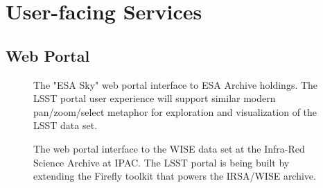 \documentclass[DM,lsstdraft,toc]{lsstdoc}
\begin{document}
\section{User-facing Services}

\subsection{Web Portal\label{sec:portal}}

\begin{figure}
	\centering
	\caption{The "ESA Sky" web portal interface to ESA Archive holdings. The LSST portal user
		experience will support similar modern pan/zoom/select metaphor for exploration and visualization of the LSST data set.
		\label{fig:portalESA}}
\end{figure}

\begin{figure}
	\centering
	\caption{The web portal interface to the WISE data set at the Infra-Red Science Archive at IPAC. The LSST portal is being built by extending the Firefly toolkit that powers the IRSA/WISE archive.
		\label{fig:portalIRSA}}
\end{figure}
\end{document}
